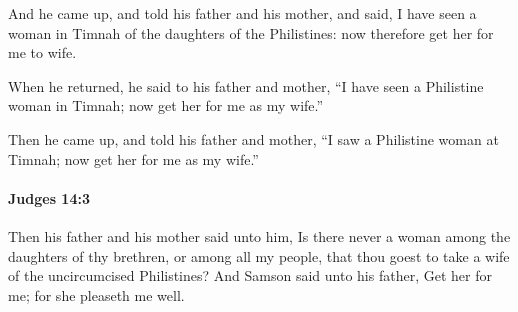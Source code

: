 			\begin{versebox}
					\item[BHS] 
					\item[ASV] And he came up, and told his father and his mother, and said, I have seen a woman in Timnah of the daughters of the Philistines: now therefore get her for me to wife.
					\item[NIV] When he returned, he said to his father and mother, “I have seen a Philistine woman in Timnah; now get her for me as my wife.”
					\item[NRSV] Then he came up, and told his father and mother, “I saw a Philistine woman at Timnah; now get her for me as my wife.”
			\end{versebox}

		\paragraph{Judges 14:3} %
			\label{JUDGES-14-3}

			Then his father and his mother said unto him, Is there never a woman among the daughters of thy brethren, or among all my people, that thou goest to take a wife of the uncircumcised Philistines? And Samson said unto his father, Get her for me; for she pleaseth me well.

